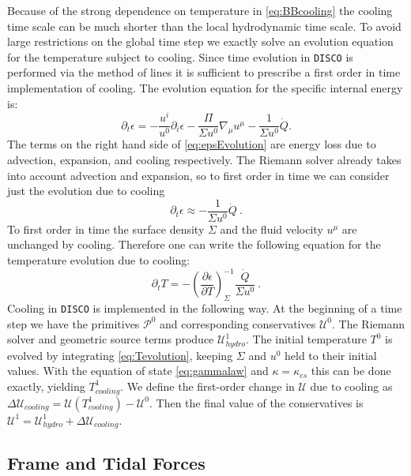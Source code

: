 \documentclass{emulateapj}
\newcommand{\De}{\Delta}
\newcommand{\eps}{\epsilon}
\newcommand{\Sig}{\Sigma}
\newcommand{\ka}{\kappa}
\newcommand{\pd}{\partial}
\newcommand{\DISCO}{{\texttt{DISCO}}}
\begin{document}
Because of the strong dependence on temperature in \eqref{eq:BBcooling} the cooling time scale can be much shorter than the local hydrodynamic time scale.  To avoid large restrictions on the global time step we exactly solve an evolution equation for the temperature subject to cooling.  Since time evolution in \DISCO{} is performed via the method of lines it is sufficient to prescribe a first order in time implementation of cooling.  The evolution equation for the specific internal energy is:
\begin{equation}
	\pd_t \eps = -\frac{u^i}{u^0} \pd_i \eps - \frac{\Pi}{\Sig u^0} \nabla_\mu u^\mu - \frac{1}{\Sig u^0} \dot{Q} . \label{eq:epsEvolution}
\end{equation}
The terms on the right hand side of \eqref{eq:epsEvolution} are energy loss due to advection, expansion, and cooling respectively.  The Riemann solver already takes into account advection and expansion, so to first order in time we can consider just the evolution due to cooling
\begin{equation}
	\pd_t \eps \approx - \frac{1}{\Sig u^0} \dot{Q} \ .
\end{equation}
To first order in time the surface density $\Sig$ and the fluid velocity $u^\mu$ are unchanged by cooling.  Therefore one can write the following equation for the temperature evolution due to cooling:
\begin{equation}
	\pd_t T = - \left(\frac{\pd \eps}{\pd T}\right)_{\Sig}^{-1} \frac{\dot{Q}}{\Sig u^0} \ . \label{eq:Tevolution}
\end{equation}
Cooling in \DISCO{} is implemented in the following way.  At the beginning of a time step we have the primitives $\mathcal{P}^0$ and corresponding conservatives $\mathcal{U}^0$.  The Riemann solver and geometric source terms produce $\mathcal{U}^1_{hydro}$.  The initial temperature $T^0$ is evolved by integrating \eqref{eq:Tevolution}, keeping $\Sig$ and $u^0$ held to their initial values.  With the equation of state \eqref{eq:gammalaw} and $\ka = \ka_{es}$ this can be done exactly, yielding $T^1_{cooling}$.  We define the first-order change in $\mathcal{U}$ due to cooling as $\De \mathcal{U}_{cooling} = \mathcal{U}(T^1_{cooling}) - \mathcal{U}^0$.  Then the final value of the conservatives is $\mathcal{U}^1 = \mathcal{U}^1_{hydro} +\De \mathcal{U}_{cooling}$.

\subsection{Frame and Tidal Forces}
\label{subsec:frameforces}
\end{document}
